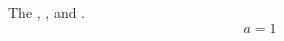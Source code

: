 \documentclass{article}
\begin{document}
The , , and .
\begin{equation} a=1 \label{anomaly} \end{equation}
\end{document}

